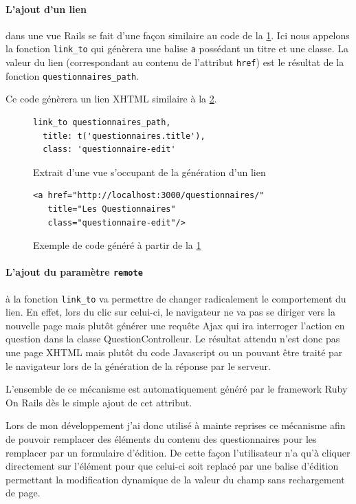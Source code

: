 \documentclass[12pt,a4paper]{book}
\begin{document}
\paragraph{L'ajout d'un lien} dans une vue Rails se fait d'une façon similaire au code de la \cref{fig.link}. Ici nous appelons la fonction \texttt{link\_to} qui génèrera une balise \texttt{a} possédant un titre et une classe. La valeur du lien (correspondant au contenu de l'attribut \texttt{href}) est le résultat de la fonction \texttt{questionnaires\_path}.

Ce code génèrera un lien XHTML similaire à la \cref{fig.link2}.

\begin{figure}[h]
\lstset{language=ruby}
\begin{lstlisting}
link_to questionnaires_path, 
  title: t('questionnaires.title'), 
  class: 'questionnaire-edit'
\end{lstlisting}
 \caption{Extrait d'une vue s'occupant de la génération d'un lien}
 \label{fig.link}
\end{figure}

\begin{figure}[h]
\lstset{language=xml}
\begin{lstlisting}
<a href="http://localhost:3000/questionnaires/" 
   title="Les Questionnaires" 
   class="questionnaire-edit"/>
\end{lstlisting}
 \caption{Exemple de code généré à partir de la \cref{fig.link}}
 \label{fig.link2}
\end{figure}

\paragraph{L'ajout du paramètre \texttt{remote}} à la fonction \texttt{link\_to} va permettre de changer radicalement le comportement du lien. En effet, lors du clic sur celui-ci, le navigateur ne va pas se diriger vers la nouvelle page mais plutôt générer une requête Ajax qui ira interroger l'action en question dans la classe QuestionControlleur. Le résultat attendu n'est donc pas une page XHTML mais plutôt du code Javascript ou un pouvant être traité par le navigateur lors de la génération de la réponse par le serveur.

L'ensemble de ce mécanisme est automatiquement généré par le framework Ruby On Rails dès le simple ajout de cet attribut.

Lors de mon développement j'ai donc utilisé à mainte reprises ce mécanisme afin de pouvoir remplacer des éléments du contenu des questionnaires pour les remplacer par un formulaire d'édition. De cette façon l'utilisateur n'a qu'à cliquer directement sur l'élément pour que celui-ci soit replacé par une balise d'édition permettant la modification dynamique de la valeur du champ sans rechargement de page.  
\end{document}
